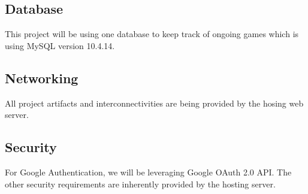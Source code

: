 	\subsection{Database}
	This project will be using one database to keep track of ongoing games which is using MySQL version 10.4.14.
	\subsection{Networking}
	All project artifacts and interconnectivities are being provided by the hosing web server.
	\subsection{Security}
	For Google Authentication, we will be leveraging Google OAuth 2.0 API. The other security requirements are inherently provided by the hosting server.


